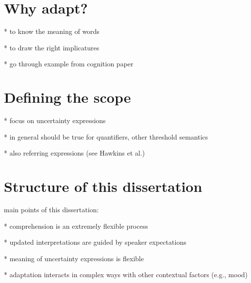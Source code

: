 \section{Why adapt?}

* to know the meaning of words

* to draw the right implicatures

* go through example from cognition paper

\section{Defining the scope}

* focus on uncertainty expressions

* in general should be true for quantifiers, other threshold semantics

* also referring expressions (see Hawkins et al.)

\section{Structure of this dissertation}

main points of this dissertation:

* comprehension is an extremely flexible process 

* updated interpretations are guided by speaker expectations

* meaning of uncertainty expressions is flexible

* adaptation interacts in complex ways with other contextual factors (e.g., mood)

